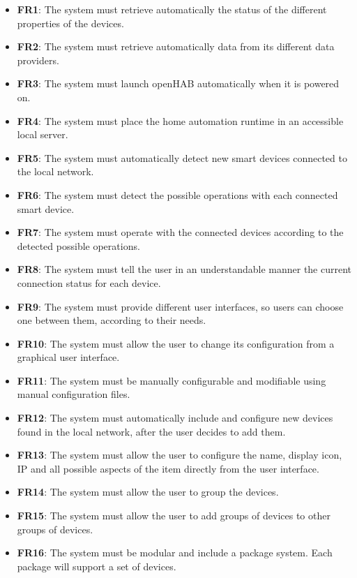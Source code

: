 \begin{itemize}
    \item \textbf{FR1}: The system must retrieve automatically the status of the different properties of the devices.
    \item \textbf{FR2}: The system must retrieve automatically data from its different data providers.
    \item \textbf{FR3}: The system must launch openHAB automatically when it is powered on.
    \item \textbf{FR4}: The system must place the home automation runtime in an accessible local server.
    \item \textbf{FR5}: The system must automatically detect new smart devices connected to the local network.
    \item \textbf{FR6}: The system must detect the possible operations with each connected smart device.
    \item \textbf{FR7}: The system must operate with the connected devices according to the detected possible operations.
    \item \textbf{FR8}: The system must tell the user in an understandable manner the current connection status for each
    device.
    \item \textbf{FR9}: The system must provide different user interfaces, so users can choose one between them, according to
    their needs.
    \item \textbf{FR10}: The system must allow the user to change its configuration from a graphical user interface.
    \item \textbf{FR11}: The system must be manually configurable and modifiable using manual configuration files.
    \item \textbf{FR12}: The system must automatically include and configure new devices found in the local network, after the user 
    decides to add them.
    \item \textbf{FR13}: The system must allow the user to configure the name, display icon, IP and all possible aspects of the item 
    directly from the user interface.
    \item \textbf{FR14}: The system must allow the user to group the devices.
    \item \textbf{FR15}: The system must allow the user to add groups of devices to other groups of devices.
    \item \textbf{FR16}: The system must be modular and include a package system. Each package will support a set of devices.

\end{itemize}
